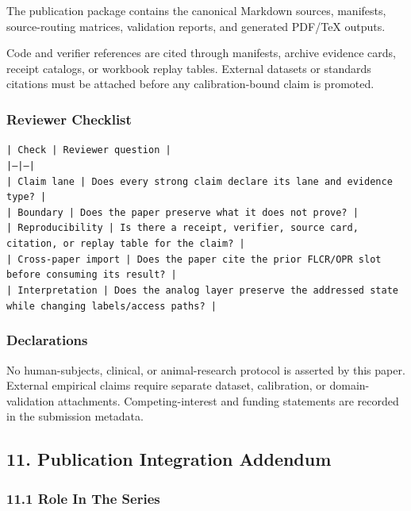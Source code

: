 \documentclass[11pt]{article}
\begin{document}
The publication package contains the canonical Markdown sources, manifests, source-routing matrices, validation reports, and generated PDF/TeX outputs.

Code and verifier references are cited through manifests, archive evidence cards, receipt catalogs, or workbook replay tables. External datasets or
standards citations must be attached before any calibration-bound claim is
promoted.

\subsubsection*{Reviewer Checklist}

\noindent\texttt{| Check | Reviewer question |}\\
\noindent\texttt{|---|---|}\\
\noindent\texttt{| Claim lane | Does every strong claim declare its lane and evidence type? |}\\
\noindent\texttt{| Boundary | Does the paper preserve what it does not prove? |}\\
\noindent\texttt{| Reproducibility | Is there a receipt, verifier, source card, citation, or replay table for the claim? |}\\
\noindent\texttt{| Cross-paper import | Does the paper cite the prior FLCR/OPR slot before consuming its result? |}\\
\noindent\texttt{| Interpretation | Does the analog layer preserve the addressed state while changing labels/access paths? |}\\

\subsubsection*{Declarations}

No human-subjects, clinical, or animal-research protocol is asserted by this
paper. External empirical claims require separate dataset, calibration, or
domain-validation attachments. Competing-interest and funding statements are recorded in the submission metadata.

\subsection*{11. Publication Integration Addendum}

\subsubsection*{11.1 Role In The Series}
\end{document}
